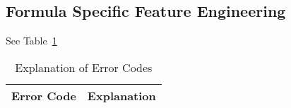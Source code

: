 \documentclass[letterpaper,12pt]{article}
\begin{document}
\subsection{Formula Specific Feature Engineering}

See Table~\ref{explanation_plp2_errs}
\begin{table}
  \centering
  \begin{tabular}{|l|l|} \hline \hline
    {\bf Error Code} & {\bf Explanation} \\ \hline  \hline
    
    \hline
  \end{tabular}
  \label{explanation_plp2_errs}
  \caption{Explanation of Error Codes}
\end{table}
\end{document}
